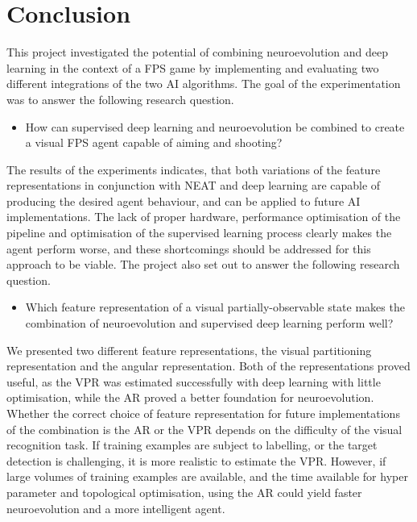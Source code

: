 \section{Conclusion}
\label{sec:conclusion}
This project investigated the potential of combining neuroevolution and deep learning in the context of a FPS game by implementing and evaluating two different integrations of the two AI algorithms. The goal of the experimentation was to answer the following research question.
\begin{itemize}
\item How can supervised deep learning and neuroevolution be combined to create a visual FPS agent capable of aiming and shooting?
\end{itemize}
The results of the experiments indicates, that both variations of the feature representations in conjunction with NEAT and deep learning are capable of producing the desired agent behaviour, and can be applied to future AI implementations. The lack of proper hardware, performance optimisation of the pipeline and optimisation of the supervised learning process clearly makes the agent perform worse, and these shortcomings should be addressed for this approach to be viable. The project also set out to answer the following research question.
\begin{itemize}
\item Which feature representation of a visual partially-observable state makes the combination of neuroevolution and supervised deep learning perform well?
\end{itemize}
We presented two different feature representations, the visual partitioning representation and the angular representation. Both of the representations proved useful, as the VPR was estimated successfully with deep learning with little optimisation, while the AR proved a better foundation for neuroevolution. Whether the correct choice of feature representation for future implementations of the combination is the AR or the VPR depends on the difficulty of the visual recognition task. If training examples are subject to labelling, or the target detection is challenging, it is more realistic to estimate the VPR. However, if large volumes of training examples are available, and the time available for hyper parameter and topological optimisation, using the AR could yield faster neuroevolution and a more intelligent agent.
